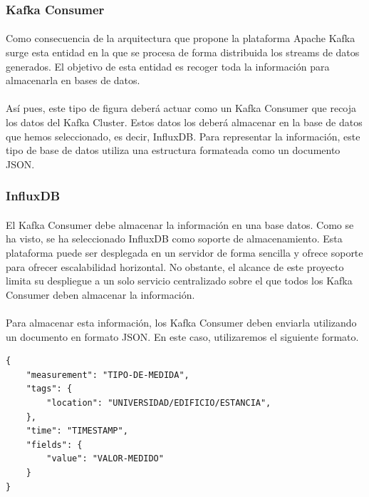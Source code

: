 \documentclass[12pt, a4paper]{article}
\begin{document}
        \subsubsection{Kafka Consumer}

        \paragraph{}
        Como consecuencia de la arquitectura que propone la plataforma Apache Kafka surge esta entidad en la que se procesa de forma distribuida los streams de datos generados. El objetivo de esta entidad es recoger toda la información para almacenarla en bases de datos.

        \paragraph{}
        Así pues, este tipo de figura deberá actuar como un Kafka Consumer que recoja los datos del Kafka Cluster. Estos datos los deberá almacenar en la base de datos que hemos seleccionado, es decir, InfluxDB. Para representar la información, este tipo de base de datos utiliza una estructura formateada como un documento JSON.

        \subsubsection{InfluxDB}

        \paragraph{}
        El Kafka Consumer debe almacenar la información en una base datos. Como se ha visto, se ha seleccionado InfluxDB como soporte de almacenamiento. Esta plataforma puede ser desplegada en un servidor de forma sencilla y ofrece soporte para ofrecer escalabilidad horizontal. No obstante, el alcance de este proyecto limita su despliegue a un solo servicio centralizado sobre el que todos los Kafka Consumer deben almacenar la información.

        \paragraph{}
        Para almacenar esta información, los Kafka Consumer deben enviarla utilizando un documento en formato JSON. En este caso, utilizaremos el siguiente formato.
        
        \begin{lstlisting}
{
    "measurement": "TIPO-DE-MEDIDA",
    "tags": {
        "location": "UNIVERSIDAD/EDIFICIO/ESTANCIA",
    },
    "time": "TIMESTAMP",
    "fields": {
        "value": "VALOR-MEDIDO"
    }
}
        \end{lstlisting}
\end{document}
